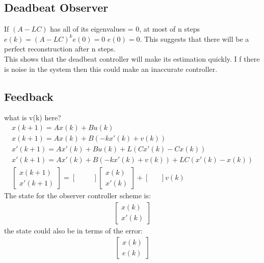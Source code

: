 \documentclass[a4paper,11pt]{article}
\begin{document}
	\subsection{Deadbeat Observer}
		If $(A - LC)$ has all of its eigenvalues = 0, at most of n steps $e(k)=(A-LC)^ke(0) = 0$ $e(0)=0$. This suggests that there will be a perfect reconstruction after n steps.\\
		This shows that the deadbeat controller will make its estimation quickly. I f there is noise in the system then this could make an inaccurate controller.

	\subsection{Feedback}
		what is v(k) here?
		\begin{gather}
			x(k+1)=Ax(k) + Bu(k)\\
			x(k+1)=Ax(k) + B(-kx'(k)+v(k))\\
			x'(k+1)=Ax'(k) + Bu(k)+L(Cx'(k)-Cx(k))\\
			x'(k+1)=Ax'(k) + B(-kx'(k)+v(k))+LC(x'(k)-x(k))\\
			\begin{bmatrix}
				x(k+1)\\
				x'(k+1)
			\end{bmatrix}=
			\begin{bmatrix}
				&&\\
				&&
			\end{bmatrix}
			\begin{bmatrix}
				x(k)\\
				x'(k)
			\end{bmatrix}
			+
			\begin{bmatrix}
				&\\
				&
			\end{bmatrix} v(k)
		\end{gather}
		The state for the observer controller scheme is:
		\begin{gather}
						\begin{bmatrix}
				x(k)\\
				x'(k)
			\end{bmatrix}
		\end{gather}
		the state could also be in terms of the error:
		\begin{gather}
						\begin{bmatrix}
				x(k)\\
				e(k)
			\end{bmatrix}
		\end{gather}
\end{document}
